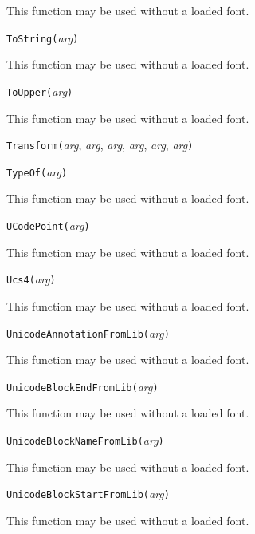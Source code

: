 This function may be used without a loaded font.


\noindent\texttt{ToString(}\textit{arg}\texttt{)}

This function may be used without a loaded font.


\noindent\texttt{ToUpper(}\textit{arg}\texttt{)}

This function may be used without a loaded font.


\noindent\texttt{Transform(}\textit{arg}, \textit{arg}, \textit{arg}, \textit{arg}, \textit{arg}, \textit{arg}\texttt{)}


\noindent\texttt{TypeOf(}\textit{arg}\texttt{)}

This function may be used without a loaded font.


\noindent\texttt{UCodePoint(}\textit{arg}\texttt{)}

This function may be used without a loaded font.


\noindent\texttt{Ucs4(}\textit{arg}\texttt{)}

This function may be used without a loaded font.


\noindent\texttt{UnicodeAnnotationFromLib(}\textit{arg}\texttt{)}

This function may be used without a loaded font.


\noindent\texttt{UnicodeBlockEndFromLib(}\textit{arg}\texttt{)}

This function may be used without a loaded font.


\noindent\texttt{UnicodeBlockNameFromLib(}\textit{arg}\texttt{)}

This function may be used without a loaded font.


\noindent\texttt{UnicodeBlockStartFromLib(}\textit{arg}\texttt{)}

This function may be used without a loaded font.

